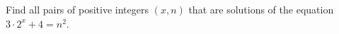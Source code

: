 Find all pairs of positive integers $(x,n) $ that are solutions of the equation $3 \cdot 2^x +4 =n^2$.